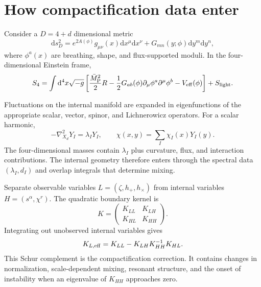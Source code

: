 \documentclass[11pt,a4paper]{article}
\newcommand{\Mpl}{\bar M_{\rm P}}
\newcommand{\dd}{\mathrm d}
\begin{document}
\section{How compactification data enter}
\label{sec:compactification}

Consider a $D=4+d$ dimensional metric
\begin{equation}
\dd s_D^2=e^{2A(\phi)}g_{\mu\nu}(x)\dd x^\mu\dd x^\nu+G_{mn}(y;\phi)\dd y^m\dd y^n,
\end{equation}
where $\phi^a(x)$ are breathing, shape, and flux-supported moduli. In the four-dimensional Einstein frame,
\begin{equation}
S_4=\int\dd^4x\sqrt{-g}\left[\frac{\Mpl^2}{2}R-
\frac12G_{ab}(\phi)\partial_\mu\phi^a\partial^\mu\phi^b-V_{\rm eff}(\phi)\right]+S_{\rm light}.
\label{eq:einstframe}
\end{equation}

Fluctuations on the internal manifold are expanded in eigenfunctions of the appropriate scalar, vector, spinor, and Lichnerowicz operators. For a scalar harmonic,
\begin{equation}
-\nabla_{X_d}^2Y_I=\lambda_IY_I,\qquad
\chi(x,y)=\sum_I\chi_I(x)Y_I(y).
\end{equation}
The four-dimensional masses contain $\lambda_I$ plus curvature, flux, and interaction contributions. The internal geometry therefore enters through the spectral data $(\lambda_I,d_I)$ and overlap integrals that determine mixing.

Separate observable variables $L=(\zeta,h_+,h_\times)$ from internal variables $H=(s^\alpha,\chi^r)$. The quadratic boundary kernel is
\begin{equation}
K=\begin{pmatrix}K_{LL}&K_{LH}\\K_{HL}&K_{HH}\end{pmatrix}.
\end{equation}
Integrating out unobserved internal variables gives
\begin{equation}
K_{L,\rm eff}=K_{LL}-K_{LH}K_{HH}^{-1}K_{HL}.
\label{eq:schur}
\end{equation}
This Schur complement is the compactification correction. It contains changes in normalization, scale-dependent mixing, resonant structure, and the onset of instability when an eigenvalue of $K_{HH}$ approaches zero.
\end{document}
